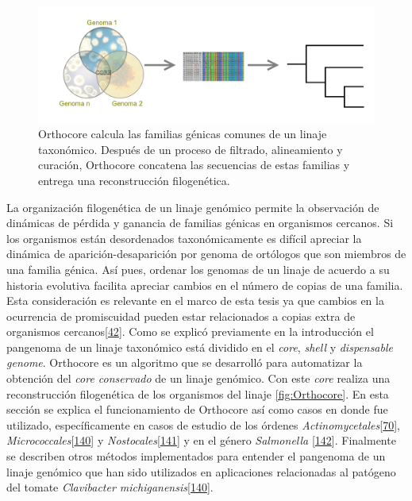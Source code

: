 \documentclass[12pt,twoside]{reedthesis}
\begin{document}
  \begin{figure}[h!tbp]
  \centering
  \includegraphics[angle = 0,scale = .44]{chapter1/coreWiki.png}
  \caption[Orthocore calcula el $core~genome$ de un linaje y construye con él una filogenia]{\footnotesize{Orthocore calcula las familias génicas comunes de un linaje taxonómico. Después de un proceso de filtrado, alineamiento y curación, Orthocore concatena las secuencias de estas familias y entrega una reconstrucción filogenética.}}
  \label{fig:Orthocore}
  \end{figure}
  
  La organización filogenética de un linaje genómico permite la
  observación de dinámicas de pérdida y ganancia de familias génicas en
  organismos cercanos. Si los organismos están desordenados
  taxonómicamente es difícil apreciar la dinámica de
  aparición-desaparición por genoma de ortólogos que son miembros de una
  familia génica. Así pues, ordenar los genomas de un linaje de acuerdo a
  su historia evolutiva facilita apreciar cambios en el número de copias
  de una familia. Esta consideración es relevante en el marco de esta
  tesis ya que cambios en la ocurrencia de promiscuidad pueden estar
  relacionados a copias extra de organismos
  cercanos{[}\protect\hyperlink{ref-verdel-aranda_molecular_2015}{42}{]}.
  Como se explicó previamente en la introducción el pangenoma de un linaje
  taxonómico está dividido en el \emph{core}, \emph{shell} y
  \emph{dispensable} \emph{genome}. Orthocore es un algoritmo que se
  desarrolló para automatizar la obtención del \emph{core conservado} de
  un linaje genómico. Con este \emph{core} realiza una reconstrucción
  filogenética de los organismos del linaje \autoref{fig:Orthocore}. En
  esta sección se explica el funcionamiento de Orthocore así como casos en
  donde fue utilizado, específicamente en casos de estudio de los órdenes
  \emph{Actinomycetales}{[}\protect\hyperlink{ref-juarez-vazquez_evolution_2017}{70}{]},
  \emph{Micrococcales}{[}\protect\hyperlink{ref-rodriguez_tesis_2016}{140}{]}
  y
  \emph{Nostocales}{[}\protect\hyperlink{ref-gutierrez-garcia_cycad_2019}{141}{]}
  y en el género \emph{Salmonella}
  {[}\protect\hyperlink{ref-delgado-suarez_whole_2018}{142}{]}. Finalmente
  se describen otros métodos implementados para entender el pangenoma de
  un linaje genómico que han sido utilizados en aplicaciones relacionadas
  al patógeno del tomate \emph{Clavibacter
  michiganensis}{[}\protect\hyperlink{ref-rodriguez_tesis_2016}{140}{]}.
  
\end{document}

